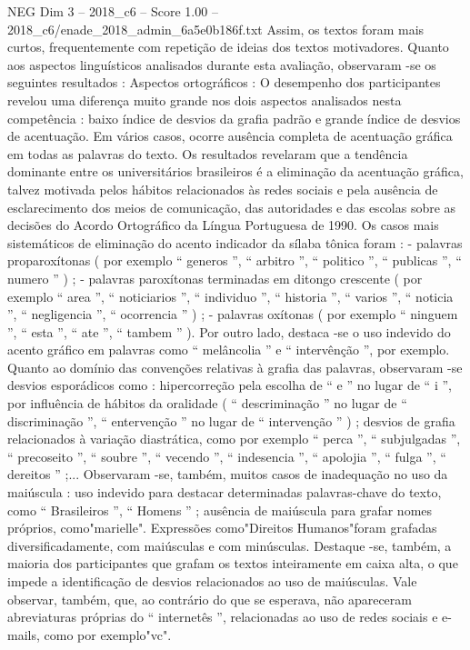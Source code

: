 \begin{textsample}{NEG Dim 3 – 2018\_c6 – Score 1.00 – 2018\_c6/enade\_2018\_admin\_6a5e0b186f.txt}
Assim, os textos foram mais curtos, frequentemente com repetição de ideias dos textos motivadores.
Quanto aos aspectos linguísticos analisados durante esta avaliação, observaram -se os seguintes resultados : Aspectos ortográficos : O desempenho dos participantes revelou uma diferença muito grande nos dois aspectos analisados nesta competência : baixo índice de desvios da grafia padrão e grande índice de desvios de acentuação.
Em vários casos, ocorre ausência completa de acentuação gráfica em todas as palavras do texto.
Os resultados revelaram que a tendência dominante entre os universitários brasileiros é a eliminação da acentuação gráfica, talvez motivada pelos hábitos relacionados às redes sociais e pela ausência de esclarecimento dos meios de comunicação, das autoridades e das escolas sobre as decisões do Acordo Ortográfico da Língua Portuguesa de 1990.
Os casos mais sistemáticos de eliminação do acento indicador da sílaba tônica foram : - palavras proparoxítonas ( por exemplo “ generos ”, “ arbitro ”, “ politico ”, “ publicas ”, “ numero ” ) ; - palavras paroxítonas terminadas em ditongo crescente ( por exemplo “ area ”, “ noticiarios ”, “ individuo ”, “ historia ”, “ varios ”, “ noticia ”, “ negligencia ”, “ ocorrencia ” ) ; - palavras oxítonas ( por exemplo “ ninguem ”, “ esta ”, “ ate ”, “ tambem ” ).
Por outro lado, destaca -se o uso indevido do acento gráfico em palavras como “ melâncolia ” e “ intervênção ”, por exemplo.
Quanto ao domínio das convenções relativas à grafia das palavras, observaram -se desvios esporádicos como : hipercorreção pela escolha de “ e ” no lugar de “ i ”, por influência de hábitos da oralidade ( “ descriminação ” no lugar de “ discriminação ”, “ entervenção ” no lugar de “ intervenção ” ) ; desvios de grafia relacionados à variação diastrática, como por exemplo “ perca ”, “ subjulgadas ”, “ precoseito ”, “ soubre ”, “ vecendo ”, “ indesencia ”, “ apolojia ”, “ fulga ”, “ dereitos ” ;...
Observaram -se, também, muitos casos de inadequação no uso da maiúscula : uso indevido para destacar determinadas palavras-chave do texto, como “ Brasileiros ”, “ Homens ” ; ausência de maiúscula para grafar nomes próprios, como"marielle".
Expressões como"Direitos Humanos"foram grafadas diversificadamente, com maiúsculas e com minúsculas.
Destaque -se, também, a maioria dos participantes que grafam os textos inteiramente em caixa alta, o que impede a identificação de desvios relacionados ao uso de maiúsculas.
Vale observar, também, que, ao contrário do que se esperava, não apareceram abreviaturas próprias do “ internetês ”, relacionadas ao uso de redes sociais e e-mails, como por exemplo"vc".

\end{textsample}
